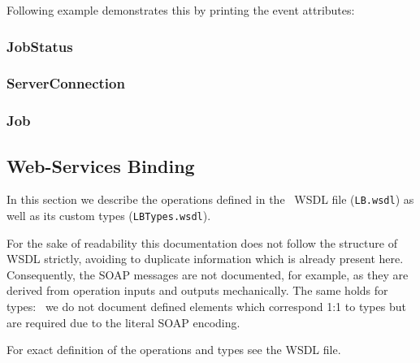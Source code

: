Following example demonstrates this by printing the event attributes:


\subsubsection{JobStatus}
\subsubsection{ServerConnection}\label{s:ServerConnection}
\subsubsection{Job}


\subsection{Web-Services Binding}\label{s:Consumer-API-WS}


In this section we describe the operations defined in the \LB\ WSDL
file (\texttt{LB.wsdl}) as well as its custom types (\texttt{LBTypes.wsdl}).

For the sake of readability this documentation does not follow the structure
of WSDL strictly, avoiding to duplicate information which is already present
here. Consequently, the SOAP messages are not documented, for example, as they
are derived from operation inputs and outputs mechanically.
The same holds for types: \eg\ we do not document defined elements
which correspond 1:1 to types but are required due to the literal SOAP
encoding.

For exact definition of the operations and types see the WSDL file.

